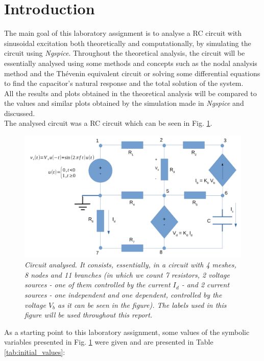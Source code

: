\section{Introduction}

The main goal of this laboratory assignment is to analyse a RC circuit with sinusoidal excitation both theoretically and computationally, by simulating the circuit using \textit{Ngspice}. Throughout the theoretical analysis, the circuit will be essentially analysed using some methods and concepts such as the nodal analysis method and the Thévenin equivalent circuit or solving some differential equations to find the capacitor's natural response and the total solution of the system. \\

All the results and plots obtained in the theoretical analysis will be compared to the values and similar plots obtained by the simulation made in \textit{Ngspice} and discussed. \\

The analysed circuit was a RC circuit which can be seen in Fig. \ref{fig:bigscheme}.

\begin{figure}[H]
    \centering
    \includegraphics[width = 0.85\linewidth]{generalscheme.pdf}
        \caption{\textit{Circuit analysed. It consists, essentially, in a circuit with 4 meshes, 8 nodes and 11 branches (in which we count 7 resistors, 2 voltage sources - one of them controlled by the current $I_d$ - and 2 current sources - one independent and one dependent, controlled by the voltage $V_b$ as it can be seen in the figure). The labels used in this figure will be used throughout this report.}}
    \label{fig:bigscheme}
\end{figure}

As a starting point to this laboratory assignment, some values of the symbolic variables presented in Fig. \ref{fig:bigscheme} were given and are presented in Table \ref{tab:initial_values}:


